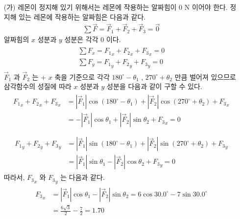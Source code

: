 \documentclass[floatfix,nofootinbib,superscriptaddress,fleqn,preprint]{revtex4}
\begin{document}
\begin{itemize}
  \item[(가)] 레몬이 정지해 있기 위해서는 레몬에 작용하는 알짜힘이
  0 N 이어야 한다. 정지해 있는 레몬에 작용하는 알짜힘은 다음과 같다.
  \begin{align}
    \sum\vec{F}=\vec{F}_1 + \vec{F}_2 + \vec{F}_3 = \vec{0}
  \end{align}
  알짜힘의 $x$ 성분과 $y$ 성분은 각각 0 이다.
  \begin{align}
    \begin{split}
      \sum F_x = {F_1}_x + {F_2}_x + {F_3}_x = 0  \\
      \sum F_y = {F_1}_y + {F_2}_y + {F_3}_y = 0  
    \end{split}
  \end{align}
  $\vec{F}_1$ 과 $\vec{F}_2$ 는 + $x$ 축을 기준으로 각각
  $180^\circ-\theta_1$ , $270^\circ+\theta_2$ 만큼 벌어져 있으므로
  삼각함수의 성질에 따라
  $x$ 성분과 $y$ 성분을 다음과 같이 구할 수 있다.
  \begin{align}
    \begin{split}
      {F_1}_x + {F_2}_x + {F_3}_x 
      &= |\vec{F}_1|\cos{(180^\circ-\theta_1)}
      +|\vec{F}_2|\cos{(270^\circ+\theta_2)} + {F_3}_x  \\
      &=-|\vec{F}_1|\cos{\theta_1}
      +|\vec{F}_2|\sin{\theta_2} + {F_3}_x = 0  \\
    \end{split}  
  \end{align}
  \begin{align}
    \begin{split}
      {F_1}_y + {F_2}_y + {F_3}_y 
      &= |\vec{F}_1|\sin{(180^\circ-\theta_1)}
      +|\vec{F}_2|\sin{(270^\circ+\theta_2)} + {F_3}_y  \\
      &= |\vec{F}_1|\sin{\theta_1}
      -|\vec{F}_2|\cos{\theta_2} + {F_3}_y=0
    \end{split}
  \end{align}
  따라서, ${F_3}_x$ 와 ${F_3}_y$ 는 다음과 같다.
  \begin{align}
    \begin{split}
      {F_3}_x&=|\vec{F}_1|\cos{\theta_1}-|\vec{F}_2|\sin{\theta_2} 
      =6\cos{30.0^\circ}-7\sin{30.0^\circ}  \\
      &=\frac{6\sqrt{3}}{2}-\frac{7}{2} = 1.70 
    \end{split}
  \end{align}
  \begin{align}
    \begin{split}

\end{split}
\end{align}
\end{itemize}
\end{document}
